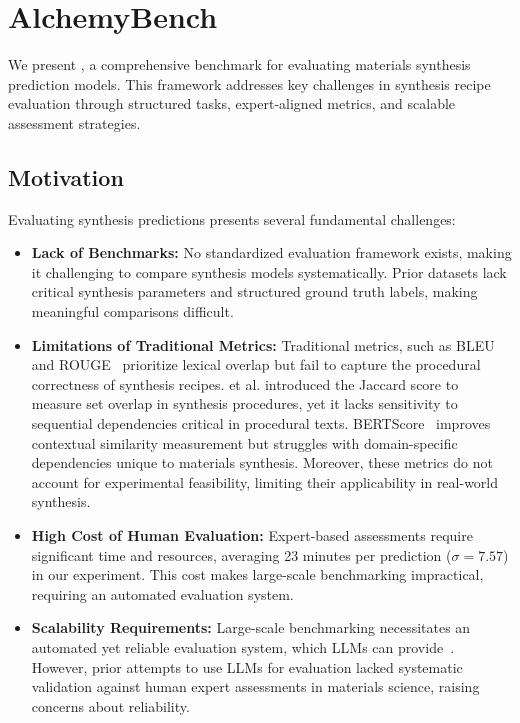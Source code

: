 \section{AlchemyBench}
\label{sec:benchmark}

We present \oursbench, a comprehensive benchmark for evaluating materials synthesis prediction models. This framework addresses key challenges in synthesis recipe evaluation through structured tasks, expert-aligned metrics, and scalable assessment strategies.

\subsection{Motivation}
\label{subsec:motivation}

Evaluating synthesis predictions presents several fundamental challenges:

\begin{itemize}
    \item \textbf{Lack of Benchmarks:} No standardized evaluation framework exists, making it challenging to compare synthesis models systematically. Prior datasets lack critical synthesis parameters and structured ground truth labels, making meaningful comparisons difficult.
    \item \textbf{Limitations of Traditional Metrics:} Traditional metrics, such as BLEU~\cite{papineni2002bleu} and ROUGE~\cite{lin2004rouge} prioritize lexical overlap but fail to capture the procedural correctness of synthesis recipes. \citeauthor{na2023artificial} et al. introduced the Jaccard score to measure set overlap in synthesis procedures, yet it lacks sensitivity to sequential dependencies critical in procedural texts. BERTScore~\cite{zhang2019bertscore} improves contextual similarity measurement but struggles with domain-specific dependencies unique to materials synthesis. Moreover, these metrics do not account for experimental feasibility, limiting their applicability in real-world synthesis.
    \item \textbf{High Cost of Human Evaluation:} Expert-based assessments require significant time and resources, averaging 23 minutes per prediction ($\sigma=7.57$) in our experiment. This cost makes large-scale benchmarking impractical, requiring an automated evaluation system.
    \item \textbf{Scalability Requirements:} Large-scale benchmarking necessitates an automated yet reliable evaluation system, which LLMs can provide~\cite{gu2025surveyllmasajudge}. However, prior attempts to use LLMs for evaluation lacked systematic validation against human expert assessments in materials science, raising concerns about reliability.
\end{itemize}

